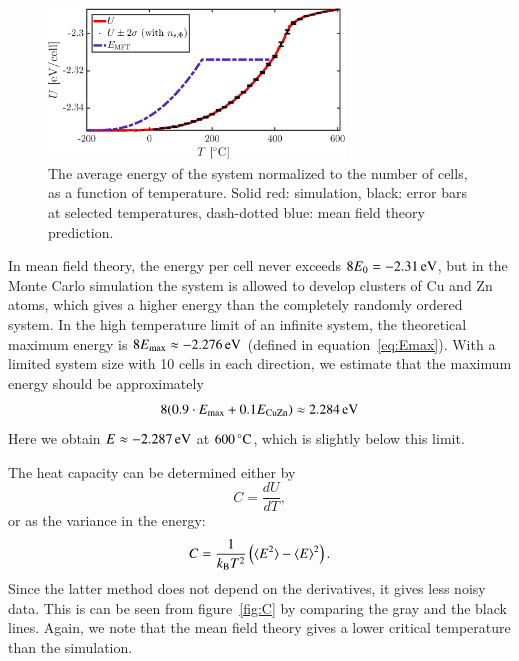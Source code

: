 \begin{figure}[!ht]
\begin{center}
  \includegraphics[width=0.7\textwidth]{../figures/U} 
  \caption{The average energy of the system normalized to the number of cells, as a function of temperature. Solid red: simulation, black: error bars at selected temperatures, dash-dotted blue: mean field theory prediction.}
  \label{fig:U}
\end{center}
\end{figure}

In mean field theory, the energy per cell never exceeds $8 E_0 = \unit[-2.31]{eV}$, but in the Monte Carlo simulation the system is allowed to develop clusters of Cu and Zn atoms, which gives a higher energy than the completely randomly ordered system. In the high temperature limit of an infinite system, the theoretical maximum energy is $ 8 E_{\rm max} \approx \unit[-2.276]{eV}$ (defined in equation~\eqref{eq:Emax}). With a limited system size with 10 cells in each direction, we estimate that the maximum energy should be approximately 
\begin{equation}
8 (0.9\cdot E_{\rm max} + 0.1 E_{\rm CuZn}) \approx \unit[2.284]{eV}
\end{equation}
Here we obtain $E \approx \unit[-2.287]{eV}$ at $\unit[600]{^\circ C}$, which is slightly below this limit. 

The heat capacity can be determined either by 
\begin{equation}
C = \frac{d U}{d T},
\label{eq:C1}
\end{equation}
or as the variance in the energy:
\begin{equation}
C = \frac{1}{k_{\rm B} T^2}\left(\langle E^2 \rangle  - \langle E \rangle^2 \right)
\label{eq:C2}.
\end{equation}
Since the latter method does not depend on the derivatives, it gives less noisy data. This is can be seen from figure~\ref{fig:C} by comparing the gray and the black lines. Again, we note that the mean field theory gives a lower critical temperature than the simulation. 

